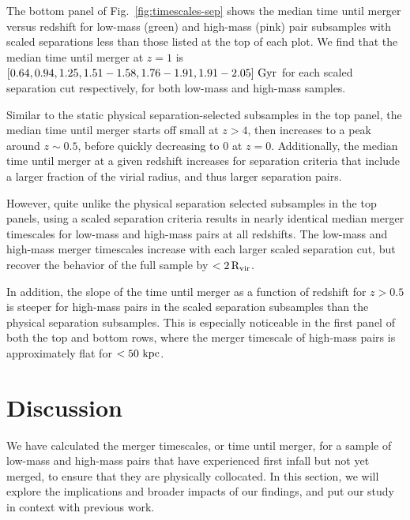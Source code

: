 \documentclass[twocolumn,linenumbers]{aastex631}
\newcommand{\kc}[1]{\textcolor{yellow}{\textbf{kc: #1}} }
\begin{document}
        The bottom panel of Fig.~\ref{fig:timescales-sep} shows the median time until merger versus redshift for low-mass (green) and high-mass (pink) pair subsamples with scaled separations less than those listed at the top of each plot. 
        We find that the median time until merger at $z=1$ is $[0.64, 0.94,1.25,1.51-1.58,1.76-1.91,1.91-2.05]\,\mathrm{\,Gyr}$ for each scaled separation cut respectively, for both low-mass and high-mass samples. %
        
        Similar to the static physical separation-selected subsamples in the top panel, the median time until merger starts off small at $z>4$, then increases to a peak around $z\sim0.5$, before quickly decreasing to 0 at $z=0$. 
        Additionally, the median time until merger at a given redshift increases for separation criteria that include a larger fraction of the virial radius, and thus larger separation pairs. 
        
        However, quite unlike the physical separation selected subsamples in the top panels, using a scaled separation criteria results in nearly identical median merger timescales for low-mass and high-mass pairs at all redshifts.
        The low-mass and high-mass merger timescales increase with each larger scaled separation cut, but recover the behavior of the full sample by $<2\,\rm R_{vir}$.
        
        In addition, the slope of the time until merger as a function of redshift for $z>0.5$ is steeper for high-mass pairs in the scaled separation subsamples than the physical separation subsamples.
        This is especially noticeable in the first panel of both the top and bottom rows, where the merger timescale of high-mass pairs is approximately flat for $<50\,\mathrm{\,kpc}$. 
    
    

\section{Discussion} \label{sec:discussion}
    We have calculated the merger timescales, or time until merger, for a sample of low-mass and high-mass pairs that have experienced first infall but not yet merged, to ensure that they are physically collocated.
    In this section, we will explore the implications and broader impacts of our findings, and put our study in context with previous work. 
    
\end{document}

